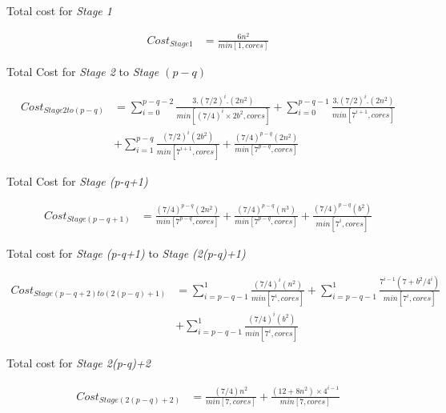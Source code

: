 Total cost for \textit{Stage 1}

\begin{equation}
    \begin{aligned}
       Cost_{Stage 1}&=\frac{6n^{2}}{min[1, cores]}        
    \end{aligned}
\end{equation}

Total Cost for \textit{Stage 2} to \textit{Stage $(p-q)$}

\begin{equation}
    \begin{aligned}
       Cost_{Stage 2 to (p-q)}&=\sum_{i=0}^{p-q-2}\frac{3.(7/2)^{i}.(2n^{2})}{min[(7/4)^{i}\times 2b^{2}, cores]}+\sum_{i=0}^{p-q-1}\frac{3.(7/2)^{i}.(2n^{2})}{min[7^{i+1}, cores]} \\
       &+\sum_{i=1}^{p-q}\frac{(7/2)^{i}(2b^{2})}{min[7^{i+1}, cores]}+\frac{(7/4)^{p-q}(2n^{2})}{min[7^{p-q}, cores]}
    \end{aligned}
\end{equation}

Total Cost for \textit{Stage (p-q+1)}

\begin{equation}
    \begin{aligned}
       Cost_{Stage (p-q+1)}&=\frac{(7/4)^{p-q}(2n^{2})}{min[7^{p-q}, cores]}+\frac{(7/4)^{p-q}(n^{3})}{min[7^{p-q}, cores]}+\frac{(7/4)^{p-q}(b^{2})}{min[7^{i}, cores]}
    \end{aligned}
\end{equation}

Total cost for \textit{Stage (p-q+1)} to \textit{Stage (2(p-q)+1)}

\begin{equation}
    \begin{aligned}
       Cost_{Stage (p-q+2) to (2(p-q)+1)}&=\sum_{i=p-q-1}^{1}\frac{(7/4)^{i}(n^{2})}{min[7^{i}, cores]}+\sum_{i=p-q-1}^{1}\frac{7^{i-1}(7+b^{2}/4^{i})}{min[7^{i}, cores]}\\&+\sum_{i=p-q-1}^{1}\frac{(7/4)^{i}(b^{2})}{min[7^{i}, cores]}
    \end{aligned}
\end{equation}

Total cost for \textit{Stage 2(p-q)+2}

\begin{equation}
    \begin{aligned}
       Cost_{Stage (2(p-q)+2)}&=\frac{(7/4)n^{2}}{min[7, cores]}+\frac{(12+8n^{2})\times 4^{i-1}}{min[7, cores]}
    \end{aligned}
\end{equation}


